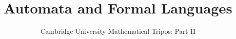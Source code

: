 \documentclass{article}
\title{Automata and Formal Languages}
\author{Cambridge University Mathematical Tripos: Part II}
\begin{document}
\maketitle

\tableofcontentsnewpage{}

%
\end{document}
